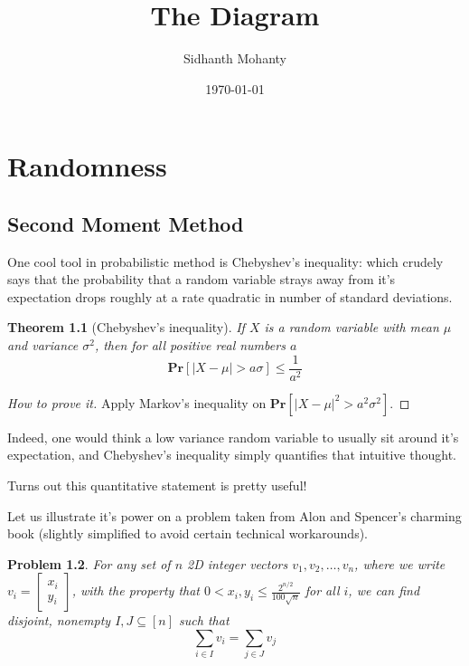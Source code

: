 \documentclass[oneside,11pt]{scrbook}
\theoremstyle{plain}
\newtheorem{theorem}{Theorem}
\newtheorem{problem}[theorem]{Problem}
\theoremstyle{definition}
\theoremstyle{remark}
\newcommand{\Prob}{\textbf{Pr}}
\begin{document}
\title{The Diagram}
\author{\textsf{Sidhanth Mohanty}}
\date{\today}
\maketitle

\tableofcontents

\chapter{Randomness}

\section{Second Moment Method}

One cool tool in probabilistic method is Chebyshev's inequality: which crudely says
that the probability that a random variable strays away from it's expectation drops
roughly at a rate quadratic in number of standard deviations.

\medskip

\begin{theorem}[\textsf{Chebyshev's inequality}]
If $X$ is a random variable with mean $\mu$ and
variance $\sigma^2$, then for all positive real numbers $a$
\[
\Prob[|X-\mu|>a\sigma]\leq\frac{1}{a^2}
\]
\end{theorem}
\begin{proof}[\textsf{How to prove it}]
Apply Markov's inequality on $\Prob[|X-\mu|^2>a^2\sigma^2]$.
\end{proof}

Indeed, one would think a low variance random variable to usually sit around it's expectation, and
Chebyshev's inequality simply quantifies that intuitive thought.

Turns out this quantitative statement is pretty useful!

Let us illustrate it's power on a problem taken from Alon and Spencer's charming book
\cite{alon2004probabilistic} (slightly simplified to avoid certain technical workarounds).

\begin{problem}
For any set of $n$ 2D integer vectors $v_1,v_2,\ldots,v_n$, where we write $v_i=\begin{bmatrix}
x_i\\
y_i
\end{bmatrix}$, with the property that $0 < x_i,y_i\leq\frac{2^{n/2}}{100\sqrt{n}}$ for all $i$,
we can find disjoint, nonempty $I,J\subseteq[n]$ such that
\[
\sum_{i\in I}v_i=\sum_{j\in J}v_j
\]
\end{problem}
\end{document}

